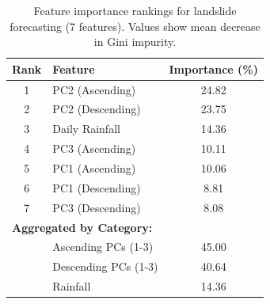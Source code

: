 \begin{table}[htbp]
\centering
\caption{Feature importance rankings for landslide forecasting (7 features). Values show mean decrease in Gini impurity.}
\label{tab:feature_importance_simple}
\begin{tabular}{clc}
\toprule
\textbf{Rank} & \textbf{Feature} & \textbf{Importance (\%)} \\
\midrule
1 & PC2 (Ascending) & 24.82 \\
2 & PC2 (Descending) & 23.75 \\
3 & Daily Rainfall & 14.36 \\
4 & PC3 (Ascending) & 10.11 \\
5 & PC1 (Ascending) & 10.06 \\
6 & PC1 (Descending) & 8.81 \\
7 & PC3 (Descending) & 8.08 \\
\midrule
\multicolumn{3}{l}{\textbf{Aggregated by Category:}} \\
& Ascending PCs (1-3) & 45.00 \\
& Descending PCs (1-3) & 40.64 \\
& Rainfall & 14.36 \\
\bottomrule
\end{tabular}
\end{table}
